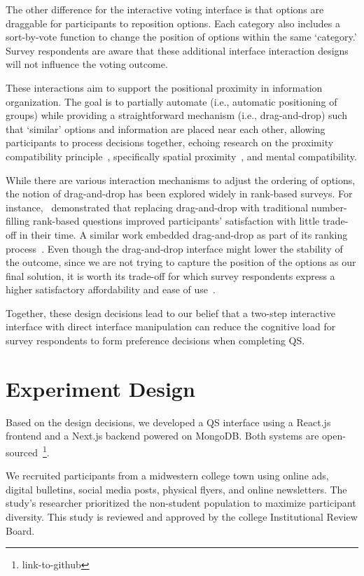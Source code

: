 The other difference for the interactive voting interface is that options are draggable for participants to reposition options. Each category also includes a sort-by-vote function to change the position of options within the same `category.' Survey respondents are aware that these additional interface interaction designs will not influence the voting outcome.

These interactions aim to support the positional proximity in information organization. The goal is to partially automate (i.e., automatic positioning of groups) while providing a straightforward mechanism (i.e., drag-and-drop) such that `similar' options and information are placed near each other, allowing participants to process decisions together, echoing research on the proximity compatibility principle~\cite{wickens1995proximity}, specifically spatial proximity~\cite{wickens1990proximity}, and mental compatibility.

While there are various interaction mechanisms to adjust the ordering of options, the notion of drag-and-drop has been explored widely in rank-based surveys. For instance,~\textcite{krosnick2018measurement} demonstrated that replacing drag-and-drop with traditional number-filling rank-based questions improved participants' satisfaction with little trade-off in their time. A similar work embedded drag-and-drop as part of its ranking process~\cite{timbrook2013comparison}. Even though the drag-and-drop interface might lower the stability of the outcome, since we are not trying to capture the position of the options as our final solution, it is worth its trade-off for which survey respondents express a higher satisfactory affordability and ease of use~\cite{rintoulVisualAnimatedResponse}.

Together, these design decisions lead to our belief that a two-step interactive interface with direct interface manipulation can reduce the cognitive load for survey respondents to form preference decisions when completing QS.

\section{Experiment Design}
Based on the design decisions, we developed a QS interface using a React.js frontend and a Next.js backend powered on MongoDB. Both systems are open-sourced~\footnote{link-to-github}.

We recruited participants from a midwestern college town using online ads, digital bulletins, social media posts, physical flyers, and online newsletters. The study's researcher prioritized the non-student population to maximize participant diversity. This study is reviewed and approved by the college Institutional Review Board.

